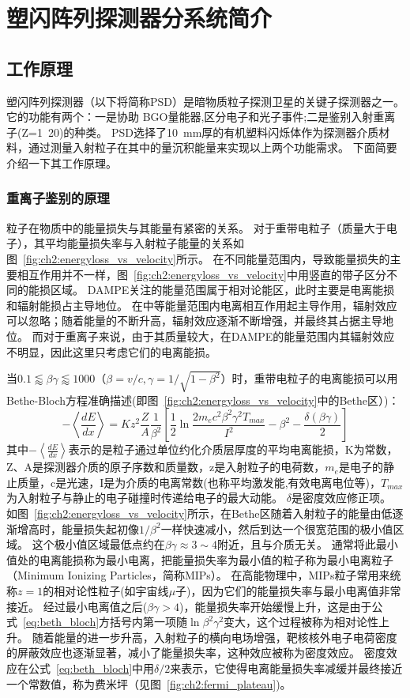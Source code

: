 \chapter{塑闪阵列探测器分系统简介}
\section{工作原理}
\label{sec:psd_principle}
塑闪阵列探测器（以下将简称PSD）是暗物质粒子探测卫星的关键子探测器之一。
它的功能有两个：一是协助 BGO量能器,区分电子和光子事件;二是鉴别入射重离子(Z=1~20)的种类。
PSD选择了\SI{10}{\milli\meter}厚的有机塑料闪烁体作为探测器介质材料，通过测量入射粒子在其中的量沉积能量来实现以上两个功能需求。
下面简要介绍一下其工作原理。

\subsection{重离子鉴别的原理}
粒子在物质中的能量损失与其能量有紧密的关系。
对于重带电粒子（质量大于电子），其平均能量损失率与入射粒子能量的关系如图~\ref{fig:ch2:energyloss_vs_velocity}所示。
在不同能量范围内，导致能量损失的主要相互作用并不一样，图~\ref{fig:ch2:energyloss_vs_velocity}中用竖直的带子区分不同的能损区域。
DAMPE关注的能量范围属于相对论能区，此时主要是电离能损和辐射能损占主导地位。
在中等能量范围内电离相互作用起主导作用，辐射效应可以忽略；随着能量的不断升高，辐射效应逐渐不断增强，并最终其占据主导地位。
而对于重离子来说，由于其质量较大，在DAMPE的能量范围内其辐射效应不明显，因此这里只考虑它们的电离能损。

当$0.1\lessapprox\beta\gamma\lessapprox1000$（$\beta=v/c,\gamma=1/\sqrt{1-{\beta}^2}$）时，重带电粒子的电离能损可以用Bethe-Bloch方程准确描述(即图~\ref{fig:ch2:energyloss_vs_velocity}中的Bethe区）)：
\begin{equation}\label{eq:beth_bloch}
-\left\langle\frac{dE}{dx}\right\rangle = Kz^2\frac{Z}{A}\frac{1}{{\beta}^2}
\left[\frac{1}{2}\ln\frac{2m_ec^2{\beta}^2{\gamma}^2T_{max}}{I^2}-{\beta}^2-\frac{\delta(\beta\gamma)}{2}\right]
\end{equation}
其中$-\left\langle\frac{dE}{dx}\right\rangle$表示的是粒子通过单位约化介质层厚度的平均电离能损，K为常数，Z、A是探测器介质的原子序数和质量数，z是入射粒子的电荷数，$m_e$是电子的静止质量，c是光速，I是为介质的电离常数(也称平均激发能,有效电离电位等)，$T_{max}$为入射粒子与静止的电子碰撞时传递给电子的最大动能。
$\delta$是密度效应修正项。
如图~\ref{fig:ch2:energyloss_vs_velocity}所示，在Bethe区随着入射粒子的能量由低逐渐增高时，能量损失起初像$1/{\beta}^2$一样快速减小，然后到达一个很宽范围的极小值区域。
这个极小值区域最低点约在$\beta\gamma\approx3\sim4$附近，且与介质无关。
通常将此最小值处的电离能损称为最小电离，把能量损失率为最小值的粒子称为最小电离粒子（Minimum Ionizing Particles，简称MIPs）。
在高能物理中，MIPs粒子常用来统称$z=1$的相对论性粒子(如宇宙线$\mu$子)，因为它们的能量损失率与最小电离值非常接近。
经过最小电离值之后($\beta\gamma>4$)，能量损失率开始缓慢上升，这是由于公式~\ref{eq:beth_bloch}方括号内第一项随$\ln{\beta}^2{\gamma}^2$变大，这个过程被称为相对论性上升。
随着能量的进一步升高，入射粒子的横向电场增强，靶核核外电子电荷密度的屏蔽效应也逐渐显著，减小了能量损失率，这种效应被称为密度效应。
密度效应在公式~\ref{eq:beth_bloch}中用$\delta/2$来表示，它使得电离能量损失率减缓并最终接近一个常数值，称为费米坪（见图~\ref{fig:ch2:fermi_plateau})。

